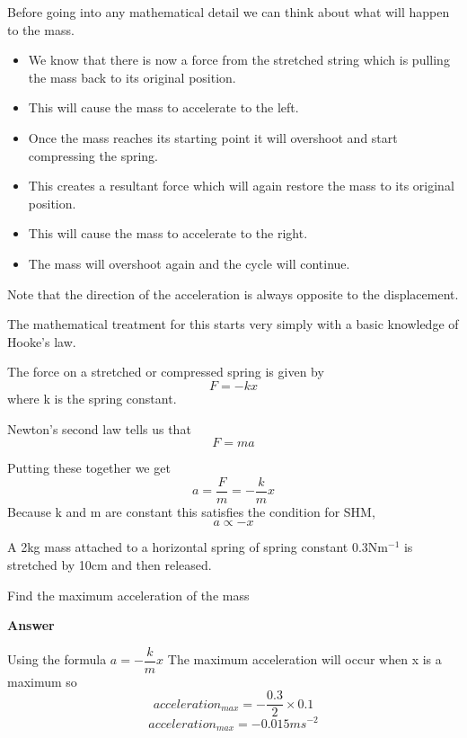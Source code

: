 \documentclass[main.tex]{subfiles}
\begin{document}


Before going into any mathematical detail we can think about what will happen to the mass.
\begin{itemize}
\item We know that there is now a force from the stretched string which is pulling the mass back to its original position. 
\item This will cause the mass to accelerate to the left. 
\item Once the mass reaches its starting point it will overshoot and start compressing the spring.
\item This creates a resultant force which will again restore the mass to its original position.
\item This will cause the mass to accelerate to the right.
\item The mass will overshoot again and the cycle will continue.
\end{itemize}
Note that the direction of the acceleration is always opposite to the displacement.

The mathematical treatment for this starts very simply with a basic knowledge of Hooke's law.

The force on a stretched or compressed spring is given by 
\[
F=-kx
\]
where k is the spring constant.

Newton's second law tells us that 
\[
F=ma
\]

Putting these together we get
\[
a = \dfrac{F}{m}=-\dfrac{k}{m}x
\]
Because k and m are constant this satisfies the condition for SHM,
\[
a \propto -x
\]

\begin{example}
A  2kg mass attached to a horizontal spring of spring constant 0.3Nm$^{-1}$ is stretched by 10cm and then released.

Find the maximum acceleration of the mass


	\vspace{1cm}

		

		\textbf{Answer}

Using the formula $a = -\dfrac{k}{m}x$
The maximum acceleration will occur when x is a maximum so 
\[
acceleration_{max} = - \dfrac{0.3}{2} \times 0.1
\]
\[
acceleration_{max} = -0.015 ms^{-2}
\]

\end{example}
\end{document}
